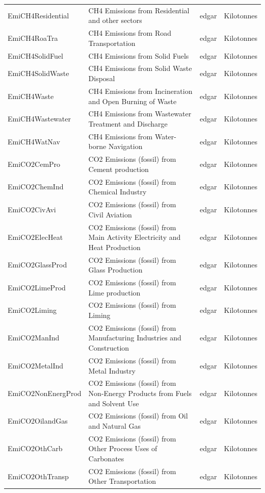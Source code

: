 \begin{longtable}[t]{>{\raggedright\arraybackslash}p{3.5cm}>{\raggedright\arraybackslash}p{5.5cm}>{\raggedright\arraybackslash}p{2cm}>{\raggedright\arraybackslash}p{4cm}}
EmiCH4Residential & CH4 Emissions from Residential and other sectors & edgar & Kilotonnes\\
EmiCH4RoaTra & CH4 Emissions from Road Transportation & edgar & Kilotonnes\\
EmiCH4SolidFuel & CH4 Emissions from Solid Fuels & edgar & Kilotonnes\\
\addlinespace
EmiCH4SolidWaste & CH4 Emissions from Solid Waste Disposal & edgar & Kilotonnes\\
EmiCH4Waste & CH4 Emissions from Incineration and Open Burning of Waste & edgar & Kilotonnes\\
EmiCH4Wastewater & CH4 Emissions from Wastewater Treatment and Discharge & edgar & Kilotonnes\\
EmiCH4WatNav & CH4 Emissions from Water-borne Navigation & edgar & Kilotonnes\\
EmiCO2CemPro & CO2 Emissions (fossil) from Cement production & edgar & Kilotonnes\\
\addlinespace
EmiCO2ChemInd & CO2 Emissions (fossil) from Chemical Industry & edgar & Kilotonnes\\
EmiCO2CivAvi & CO2 Emissions (fossil) from Civil Aviation & edgar & Kilotonnes\\
EmiCO2ElecHeat & CO2 Emissions (fossil) from Main Activity Electricity and Heat Production & edgar & Kilotonnes\\
EmiCO2GlassProd & CO2 Emissions (fossil) from Glass Production & edgar & Kilotonnes\\
EmiCO2LimeProd & CO2 Emissions (fossil) from Lime production & edgar & Kilotonnes\\
\addlinespace
EmiCO2Liming & CO2 Emissions (fossil) from Liming & edgar & Kilotonnes\\
EmiCO2ManInd & CO2 Emissions (fossil) from Manufacturing Industries and Construction & edgar & Kilotonnes\\
EmiCO2MetalInd & CO2 Emissions (fossil) from Metal Industry & edgar & Kilotonnes\\
EmiCO2NonEnergProd & CO2 Emissions (fossil) from Non-Energy Products from Fuels and Solvent Use & edgar & Kilotonnes\\
EmiCO2OilandGas & CO2 Emissions (fossil) from Oil and Natural Gas & edgar & Kilotonnes\\
\addlinespace
EmiCO2OthCarb & CO2 Emissions (fossil) from Other Process Uses of Carbonates & edgar & Kilotonnes\\
EmiCO2OthTransp & CO2 Emissions (fossil) from Other Transportation & edgar & Kilotonnes\\

\end{longtable}
